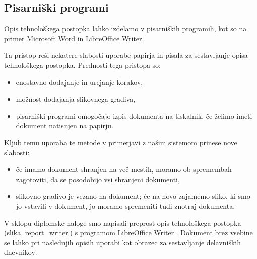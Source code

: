 \documentclass[a4paper, 12pt]{book}
\begin{document}
\subsection{Pisarniški programi}

Opis tehnološkega postopka lahko izdelamo v pisarniških programih, kot so na primer Microsoft Word in LibreOffice Writer.

Ta pristop reši nekatere slabosti uporabe papirja in pisala za sestavljanje opisa tehnološkega postopka.
Prednosti tega pristopa so:
\begin{itemize}
	\item enostavno dodajanje in urejanje korakov,
	\item možnost dodajanja slikovnega gradiva,
	\item pisarniški programi omogočajo izpis dokumenta na tiskalnik, če želimo imeti dokument natisnjen na papirju.
\end{itemize}

Kljub temu uporaba te metode v primerjavi z našim sistemom prinese nove slabosti:
\begin{itemize}
	\item če imamo dokument shranjen na več mestih, moramo ob spremembah zagotoviti, da se posodobijo vsi shranjeni dokumenti,
	\item slikovno gradivo je vezano na dokument; če na novo zajamemo sliko, ki smo jo vstavili v dokument, jo moramo spremeniti tudi znotraj dokumenta.
\end{itemize}

V sklopu diplomske naloge smo napisali preprost opis tehnološkega postopka (slika \ref{report_writer}) s programom LibreOffice Writer \cite{writer}.
Dokument brez vsebine se lahko pri naslednjih opisih uporabi kot obrazec za sestavljanje delavniških dnevnikov.
\clearpage
\end{document}
